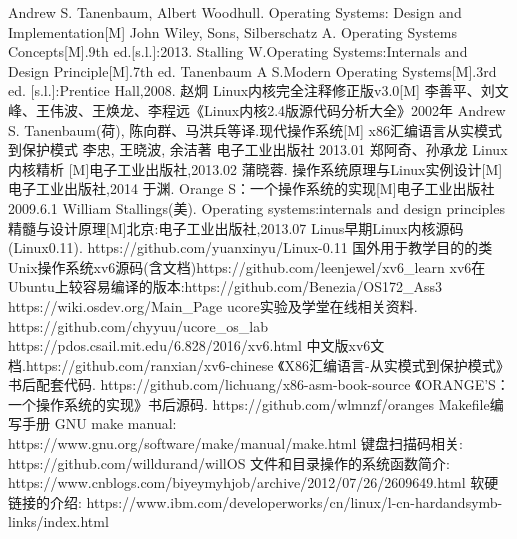 \documentclass[openright,oneside]{ctexbook}	%
\begin{document}
\begin{thebibliography}{99}
Andrew S. Tanenbaum, Albert Woodhull. Operating Systems: Design and Implementation[M]
John Wiley, Sons, Silberschatz A. Operating Systems Concepts[M].9th ed.[s.l.]:2013.
Stalling W.Operating Systems:Internals and Design Principle[M].7th ed.
Tanenbaum A S.Modern Operating Systems[M].3rd ed. [s.l.]:Prentice Hall,2008.
赵炯 Linux内核完全注释修正版v3.0[M]
李善平、刘文峰、王伟波、王焕龙、李程远《Linux内核2.4版源代码分析大全》2002年
Andrew S. Tanenbaum(荷), 陈向群、马洪兵等译.现代操作系统[M]
x86汇编语言从实模式到保护模式 李忠, 王晓波, 余洁著 电子工业出版社 2013.01
郑阿奇、孙承龙 Linux内核精析 [M]电子工业出版社,2013.02
蒲晓蓉. 操作系统原理与Linux实例设计[M] 电子工业出版社,2014
于渊. Orange S：一个操作系统的实现[M]电子工业出版社 2009.6.1
William Stallings(美). Operating systems:internals and design principles精髓与设计原理[M]北京:电子工业出版社,2013.07
Linus早期Linux内核源码(Linux0.11). https://github.com/yuanxinyu/Linux-0.11
国外用于教学目的的类Unix操作系统xv6源码(含文档)https://github.com/leenjewel/xv6\_learn
xv6在Ubuntu上较容易编译的版本:https://github.com/Benezia/OS172\_Ass3 
https://wiki.osdev.org/Main\_Page
ucore实验及学堂在线相关资料. https://github.com/chyyuu/ucore\_os\_lab
https://pdos.csail.mit.edu/6.828/2016/xv6.html
中文版xv6文档.https://github.com/ranxian/xv6-chinese
《X86汇编语言-从实模式到保护模式》书后配套代码. https://github.com/lichuang/x86-asm-book-source
《ORANGE’S：一个操作系统的实现》书后源码. https://github.com/wlmnzf/oranges
Makefile编写手册 GNU make manual: https://www.gnu.org/software/make/manual/make.html
键盘扫描码相关: https://github.com/willdurand/willOS
文件和目录操作的系统函数简介: https://www.cnblogs.com/biyeymyhjob/archive/2012/07/26/2609649.html
软硬链接的介绍: https://www.ibm.com/developerworks/cn/linux/l-cn-hardandsymb-links/index.html

\end{thebibliography}
\end{document}
